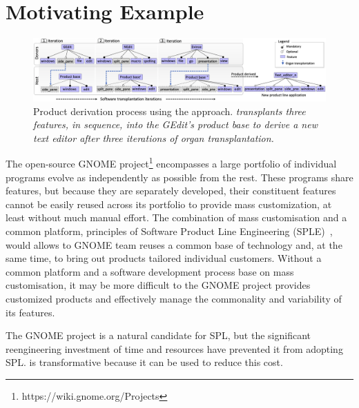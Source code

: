 \section{Motivating Example} \label{sec:motivating_example}

 \begin{figure}[t]
	\centering \includegraphics[width=\textwidth]{images/incremental_ST4.png}
	\caption{Product derivation process using the \FOUNDRY approach. \textit{\prodscalpel transplants three features, in sequence, into the GEdit's product base to derive a new text editor after three iterations of organ transplantation.} }
	\label{fig:incremental_pd}
\end{figure} 

The open-source GNOME project\footnote{https://wiki.gnome.org/Projects} encompasses a large portfolio of individual programs evolve as independently as possible from the rest. These programs share features, but because they are separately developed, their constituent features cannot be easily reused across its portfolio to provide mass customization, at least without much manual effort. The combination of mass customisation and a common platform, principles of Software Product Line Engineering (SPLE)~\cite{Pohl2005}, would allows to GNOME team reuses a common base of technology and, at the same time, to bring out products tailored individual customers. Without a common platform and a software development process base on mass customisation, it may be more difficult to the GNOME project provides customized products and effectively manage the commonality and variability of its features.

The GNOME  project is a natural candidate for SPL, but the significant reengineering investment of time and resources have prevented it from adopting SPL. \FOUNDRY is transformative because it can be used to reduce this cost. 

